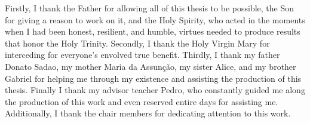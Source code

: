 Firstly, I thank the Father for allowing all of this thesis to be possible, the Son for giving a reason to work on it, and the Holy Spirity, who acted in the moments when I had been honest, resilient, and humble, virtues needed to produce results that honor the Holy Trinity. Secondly, I thank the Holy Virgin Mary for interceding for everyone's envolved true benefit. Thirdly, I thank my father Donato Sadao, my mother Maria da Assunção, my sister Alice, and my brother Gabriel for helping me through my existence and assisting the production of this thesis. Finally I thank my advisor teacher Pedro, who constantly guided me along the production of this work and even reserved entire days for assisting me. Additionally, I thank the chair members for dedicating attention to this work.
